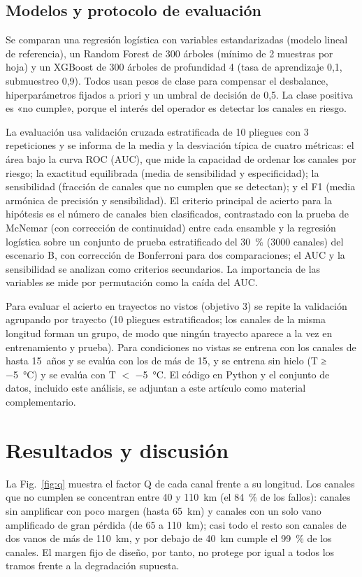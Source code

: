 \documentclass[runningheads]{llncs}
\begin{document}
\subsection{Modelos y protocolo de evaluación}

Se comparan una regresión logística con variables estandarizadas (modelo lineal de referencia), un Random Forest de 300 árboles (mínimo de 2 muestras por hoja) y un XGBoost de 300 árboles de profundidad 4 (tasa de aprendizaje 0,1, submuestreo 0,9). Todos usan pesos de clase para compensar el desbalance, hiperparámetros fijados a priori y un umbral de decisión de 0,5. La clase positiva es «no cumple», porque el interés del operador es detectar los canales en riesgo.

La evaluación usa validación cruzada estratificada de 10 pliegues con 3 repeticiones y se informa de la media y la desviación típica de cuatro métricas: el área bajo la curva ROC (AUC), que mide la capacidad de ordenar los canales por riesgo; la exactitud equilibrada (media de sensibilidad y especificidad); la sensibilidad (fracción de canales que no cumplen que se detectan); y el F1 (media armónica de precisión y sensibilidad). El criterio principal de acierto para la hipótesis es el número de canales bien clasificados, contrastado con la prueba de McNemar (con corrección de continuidad) entre cada ensamble y la regresión logística sobre un conjunto de prueba estratificado del 30~\% (3000 canales) del escenario B, con corrección de Bonferroni para dos comparaciones; el AUC y la sensibilidad se analizan como criterios secundarios. La importancia de las variables se mide por permutación como la caída del AUC.

Para evaluar el acierto en trayectos no vistos (objetivo 3) se repite la validación agrupando por trayecto (10 pliegues estratificados; los canales de la misma longitud forman un grupo, de modo que ningún trayecto aparece a la vez en entrenamiento y prueba). Para condiciones no vistas se entrena con los canales de hasta 15~años y se evalúa con los de más de 15, y se entrena sin hielo (T ≥ −5~°C) y se evalúa con T $<$ −5~°C. El código en Python y el conjunto de datos, incluido este análisis, se adjuntan a este artículo como material complementario.


\section{Resultados y discusión}\label{sec:3}

La Fig.~\ref{fig:q} muestra el factor Q de cada canal frente a su longitud. Los canales que no cumplen se concentran entre 40 y 110~km (el 84~\% de los fallos): canales sin amplificar con poco margen (hasta 65~km) y canales con un solo vano amplificado de gran pérdida (de 65 a 110~km); casi todo el resto son canales de dos vanos de más de 110~km, y por debajo de 40~km cumple el 99~\% de los canales. El margen fijo de diseño, por tanto, no protege por igual a todos los tramos frente a la degradación supuesta.
\end{document}
